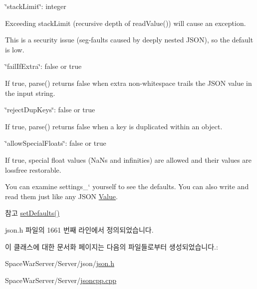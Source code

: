 \begin{DoxyItemize}
\begin{DoxyItemize}
\end{DoxyItemize}
\item {\ttfamily \char`\"{}stack\+Limit\char`\"{}\+: integer}
\begin{DoxyItemize}
\item Exceeding stack\+Limit (recursive depth of {\ttfamily read\+Value()}) will cause an exception.
\item This is a security issue (seg-\/faults caused by deeply nested J\+S\+ON), so the default is low.
\end{DoxyItemize}
\item {\ttfamily \char`\"{}fail\+If\+Extra\char`\"{}\+: false or true}
\begin{DoxyItemize}
\item If true, {\ttfamily parse()} returns false when extra non-\/whitespace trails the J\+S\+ON value in the input string.
\end{DoxyItemize}
\item {\ttfamily \char`\"{}reject\+Dup\+Keys\char`\"{}\+: false or true}
\begin{DoxyItemize}
\item If true, {\ttfamily parse()} returns false when a key is duplicated within an object.
\end{DoxyItemize}
\item {\ttfamily \char`\"{}allow\+Special\+Floats\char`\"{}\+: false or true}
\begin{DoxyItemize}
\item If true, special float values (Na\+Ns and infinities) are allowed and their values are lossfree restorable.
\end{DoxyItemize}
\end{DoxyItemize}

You can examine \textquotesingle{}settings\+\_\+` yourself to see the defaults. You can also write and read them just like any J\+S\+ON \hyperlink{class_json_1_1_value}{Value}. \begin{DoxySeeAlso}{참고}
\hyperlink{class_json_1_1_char_reader_builder_a03ff031e06aabff989ab4addc87294ab}{set\+Defaults()} 
\end{DoxySeeAlso}


json.\+h 파일의 1661 번째 라인에서 정의되었습니다.



이 클래스에 대한 문서화 페이지는 다음의 파일들로부터 생성되었습니다.\+:\begin{DoxyCompactItemize}
\item 
Space\+War\+Server/\+Server/json/\hyperlink{json_8h}{json.\+h}\item 
Space\+War\+Server/\+Server/\hyperlink{jsoncpp_8cpp}{jsoncpp.\+cpp}\end{DoxyCompactItemize}
